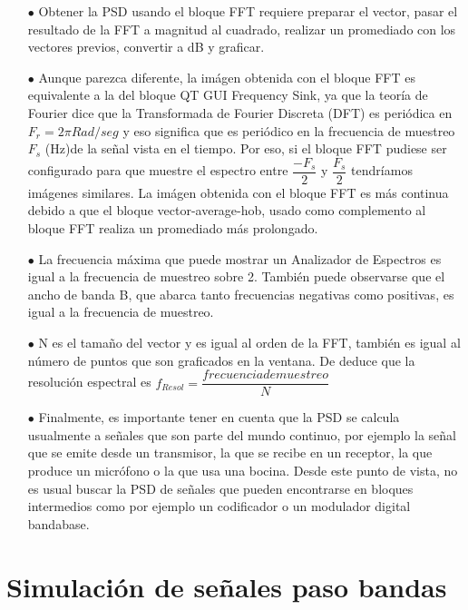 \begin{itemize}
	\item [$\bullet$]  Obtener la PSD usando el bloque FFT requiere preparar el vector, pasar el resultado de la FFT a magnitud al cuadrado, realizar un promediado con los vectores previos, convertir a dB y graficar. 
	\item [$\bullet$]  Aunque parezca diferente, la imágen obtenida con el bloque FFT es equivalente a la del bloque QT GUI Frequency Sink, ya que la teoría de Fourier dice que la Transformada de Fourier Discreta (DFT) es periódica en $F_{r}= 2\pi Rad/seg$ y eso significa que es periódico en la frecuencia de muestreo $F_{s}$ (Hz)de la señal vista en el tiempo. Por eso, si el bloque FFT pudiese ser configurado para que muestre el espectro entre $\dfrac{-F_{s}}{2}$ y $\dfrac{F_{s}}{2}$ tendríamos imágenes similares. La imágen obtenida con el bloque FFT es más continua debido a que el bloque vector-average-hob, usado como complemento al bloque FFT realiza un promediado más prolongado.
	\item  [$\bullet$] La frecuencia máxima que puede mostrar un Analizador de Espectros es igual a la frecuencia de muestreo sobre 2. También puede observarse que el ancho de banda B, que abarca tanto frecuencias negativas como positivas, es igual a la frecuencia de muestreo.
	\item [$\bullet$]  N es el tamaño del vector y es igual al orden de la FFT, también es igual al número de puntos que son graficados en la ventana. De deduce que la resolución espectral es 	$ f_{Resol} = \dfrac{frecuencia de muestreo}{N}$
	\item [$\bullet$]  Finalmente, es importante tener en cuenta que la PSD se calcula usualmente a señales que son parte del mundo continuo, por ejemplo la señal que se emite desde un transmisor, la que se recibe en un receptor, la que produce un micrófono o la que usa una bocina. Desde este punto de vista, no es usual buscar la PSD de señales que pueden encontrarse en bloques intermedios como por ejemplo un codificador o un modulador digital bandabase.	
\end{itemize}


\section{Simulación de señales paso bandas}



